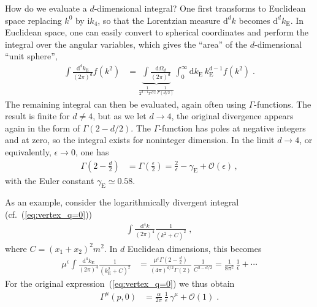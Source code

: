 \documentclass[12pt]{report}
\renewcommand{\d}{\text{d}}
\renewcommand{\i}{\ensuremath{\text{i}}}
\newcommand{\2}{\ensuremath{\sqrt{2}\,}}
\renewcommand{\d}{\ensuremath{\text{d}}}
\begin{document}
{      
      How do we evaluate a $d$-dimensional integral? One first
      transforms to Euclidean space
      replacing $k^0$ by $\i k_4$, so that the Lorentzian
      measure $\d^d k$ becomes $\d^d k_\text{E}$.
      In Euclidean space, one can easily convert to 
      spherical coordinates and perform the integral over the angular variables, which
      gives the ``area'' of the $d$-dimensional ``unit sphere'',
      \begin{align}
        \int\frac{\d^d k_\text{E}}{\left(2\pi\right)^d} f\!\left(k^2\right) &= \underbrace{\int
          \frac{\d \Omega_d}{\left(2\pi\right)^d}}_{\textstyle\frac{1}{2^{d-1} \pi^{d/2}}
          \frac{1}{\Gamma(d/2)}} \int_0^\infty \d k_\text{E}\, k_\text{E}^{d-1} 
        f\!\left(k^2\right) \;.
      \end{align}
      The remaining integral can then be evaluated, again often using $\Gamma$-functions. The result
      is finite for $d\neq 4$, but as we let $d\to 4$, the original divergence appears again
      in the form of $\Gamma\!\left(2-d/2\right)$. The $\Gamma$-function has poles at
      negative integers and at zero, so the integral exists for noninteger
      dimension. In the limit $d\to 4$, or equivalently, $\epsilon\to 0$, one has
      \begin{align}
        \Gamma\!\left(2-\frac{d}{2}\right) &=\Gamma \!\left(\frac{\epsilon}{2}\right) =
        \frac{2}{\epsilon} - \gamma_\text{E} +\mathcal{O}\left(\epsilon\right)\,,
      \end{align}
      with the Euler constant $\gamma_\text{E}\simeq 0.58$.
      
      As an example, consider the logarithmically divergent integral (cf.~(\ref{eq:vertex_q=0}))
      \begin{align}
         \int \frac{\d^4 k}{\left(2\pi\right)^4} \frac{1}{\left(k^2 +C\right)^2}\;,
      \end{align}
      where $C=\left(x_1+x_2\right)^2 m^2$. In $d$ Euclidean dimensions, this becomes 
      \begin{align}
         \mu^\epsilon \int \frac{\d^4 k_\text{E}}{\left(2\pi\right)^4} \frac{1}{\left(k_\text{E}^2 +C\right)^2}
        &= \frac{ \mu^\epsilon \Gamma\!\left(2-\frac{d}{2}\right)}{\left(4\pi\right)^{d/2}
          \Gamma(2)}\,\frac{1}{C^{2-d/2}} =\frac{1}{8\pi^2} \, \frac{1}{\epsilon} + \dotsm 
      \end{align}
      For the original expression~(\ref{eq:vertex_q=0}) we thus obtain
      \begin{align}
        \Gamma^\mu\left(p,0\right)&= \frac{\alpha}{2\pi}\,\frac{1}{\epsilon}\, \gamma^\mu
        +\mathcal{O}(1)\;.
      \end{align}

}
\end{document}
